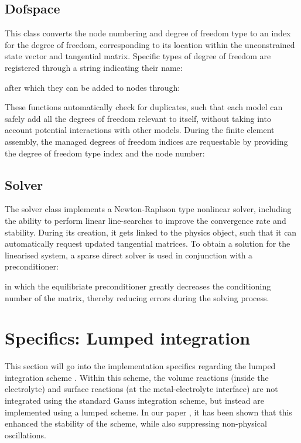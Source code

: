 \documentclass[3p]{elsarticle} %
\begin{document}
\subsection{Dofspace}
This class converts the node numbering and degree of freedom type to an index for the degree of freedom, corresponding to its location within the unconstrained state vector and tangential matrix. Specific types of degree of freedom are registered through a string indicating their name:

after which they can be added to nodes through:

These functions automatically check for duplicates, such that each model can safely add all the degrees of freedom relevant to itself, without taking into account potential interactions with other models. During the finite element assembly, the managed degrees of freedom indices are requestable by providing the degree of freedom type index and the node number:


\subsection{Solver}
The solver class implements a Newton-Raphson type nonlinear solver, including the ability to perform linear line-searches to improve the convergence rate and stability. During its creation, it gets linked to the physics object, such that it can automatically request updated tangential matrices. To obtain a solution for the linearised system, a sparse direct solver is used in conjunction with a preconditioner:

in which the equilibriate preconditioner greatly decreases the conditioning number of the matrix, thereby reducing errors during the solving process. 

\section{Specifics: Lumped integration}
\label{sec:LumpedScheme}
This section will go into the implementation specifics regarding the lumped integration scheme \citep{Schellekens1993, Hageman2019b, Hageman2020a}. Within this scheme, the volume reactions (inside the electrolyte) and surface reactions (at the metal-electrolyte interface) are not integrated using the standard Gauss integration scheme, but instead are implemented using a lumped scheme. In our paper \citep{Hageman2023}, it has been shown that this enhanced the stability of the scheme, while also suppressing non-physical oscillations. 
\end{document}

